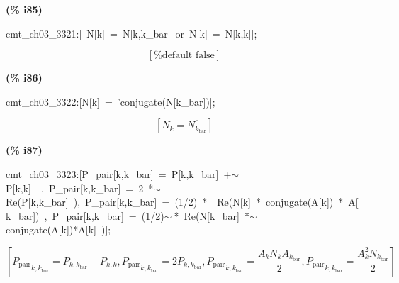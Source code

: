 \documentclass[fleqn]{article}
\begin{document}
\noindent
\begin{minipage}[t]{4.000000em}\color{red}\bfseries
(\% i85)	
\end{minipage}
\begin{minipage}[t]{\textwidth}\color{blue}
cmt\_ch03\_3321:[\ N[k]\ =\ N[k,k\_bar]\ or\ N[k]\ =\ N[k,k]];
\end{minipage}
\[\displaystyle \tag{cmt\_ ch03\_ 3321} 
\left[ \mbox{%
false}\right] \mbox{}
\]


\noindent
\begin{minipage}[t]{4.000000em}\color{red}\bfseries
(\% i86)	
\end{minipage}
\begin{minipage}[t]{\textwidth}\color{blue}
cmt\_ch03\_3322:[N[k]\ =\ 'conjugate(N[k\_bar])];
\end{minipage}
\[\displaystyle \tag{cmt\_ ch03\_ 3322} 
\left[ {N_k}=\overline{{N_{{k_{\ensuremath{\mathrm{bar}}}}}}}\right] \mbox{}
\]


\noindent
\begin{minipage}[t]{4.000000em}\color{red}\bfseries
(\% i87)	
\end{minipage}
\begin{minipage}[t]{\textwidth}\color{blue}
cmt\_ch03\_3323:[P\_pair[k,k\_bar]\ =\ P[k,k\_bar]\ +\ensuremath{\sim\ }P[k,k]\ \ ,\ P\_pair[k,k\_bar]\ =\ 2\ *\ensuremath{\sim\ }Re(P[k,k\_bar]\ ),\ P\_pair[k,k\_bar]\ =\ (1/2)\ *\ \ Re(N[k]\ *\ conjugate(A[k])\ *\ A[k\_bar])\ ,\ P\_pair[k,k\_bar]\ =\ (1/2)\ensuremath{\sim\ }*\ Re(N[k\_bar]\ *\ensuremath{\sim\ }conjugate(A[k])*A[k]\ )];
\end{minipage}
\[\displaystyle \tag{cmt\_ ch03\_ 3323} 
\left[ {{{P_{\ensuremath{\mathrm{pair}}}}}_{k,{k_{\ensuremath{\mathrm{bar}}}}}}={P_{k,{k_{\ensuremath{\mathrm{bar}}}}}}+{P_{k,k}}\operatorname{,}{{{P_{\ensuremath{\mathrm{pair}}}}}_{k,{k_{\ensuremath{\mathrm{bar}}}}}}=2 {P_{k,{k_{\ensuremath{\mathrm{bar}}}}}}\operatorname{,}{{{P_{\ensuremath{\mathrm{pair}}}}}_{k,{k_{\ensuremath{\mathrm{bar}}}}}}=\frac{{A_k} {N_k} {A_{{k_{\ensuremath{\mathrm{bar}}}}}}}{2}\operatorname{,}{{{P_{\ensuremath{\mathrm{pair}}}}}_{k,{k_{\ensuremath{\mathrm{bar}}}}}}=\frac{{{A}_{k}^{2}} {N_{{k_{\ensuremath{\mathrm{bar}}}}}}}{2}\right] \mbox{}
\]
\end{document}
